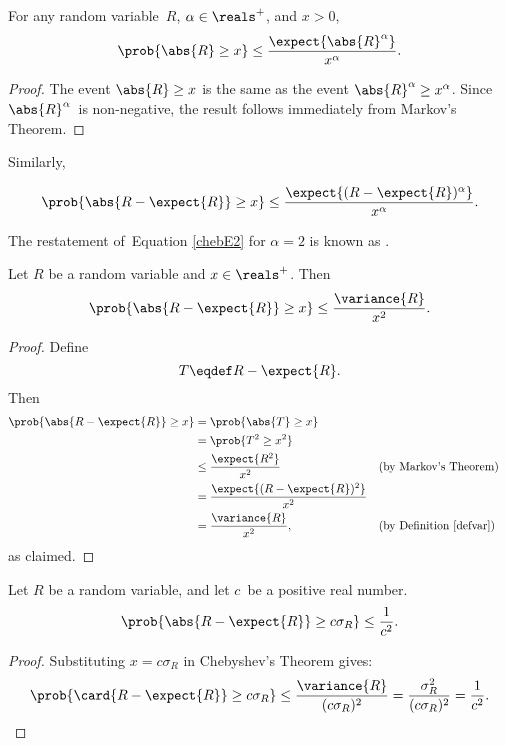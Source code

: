\begin{lemma}\label{lem:Markov2}
For any random variable~$R$, $\alpha \in \reals^+$, and $x > 0$,
\[
\prob{\abs{R} \geq x} \leq \frac{\expect{\abs{R}^\alpha}}{x^\alpha}.
\]
\end{lemma}

\begin{proof}
The event $\abs{R} \ge x$ is the same as the event $\abs{R}^\alpha \ge
x^\alpha$.  Since $\abs{R}^\alpha$~is non-negative, the result follows
immediately from Markov's Theorem.
\end{proof}

Similarly,

\begin{equation}\label{chebE2}
\prob{\abs{R - \expect{R}} \geq x}
    \leq \frac{\expect{(R - \expect{R})^\alpha}}{x^\alpha}.
\end{equation}

The restatement of~Equation \ref{chebE2} for $\alpha=2$ is known as
.
\begin{theorem}[Chebyshev]\label{chebthm}
  Let $R$ be a random variable and $x \in \reals^+$.  Then
\[
\prob{\abs{R - \expect{R}} \geq x} \leq \frac{\variance{R}}{x^2}.
\]
\end{theorem}

\begin{proof}

Define
\begin{equation*}
    T \eqdef R - \expect{R}.
\end{equation*}
Then
\begin{align*}
\prob{ \abs{R - \expect{R}} \ge x }
    &= \prob{\abs{T} \ge x} \\
     &= \prob{T^2 \ge x^2} \\
     &\le \frac{\expect{R^2}}{x^2} && \text{(by Markov's Theorem)} \\
     & = \frac{ \expect{ (R - \expect{R})^2 } }{x^2} \\
     &= \frac{\variance{R}}{x^2},  && \text{(by Definition~\ref{defvar})}
\end{align*}
as claimed.
\end{proof}


\begin{corollary}
\label{cor:cheby}
Let $R$ be a random variable, and let $c$~be a positive real number.
\[
\prob{\abs{R - \expect{R}} \geq c \sigma_R} \leq \frac{1}{c^2}.
\]
\end{corollary}

\begin{proof}
  Substituting $x = c \sigma_R$ in Chebyshev's Theorem gives:
  \begin{equation*}
    \prob{\card{R - \expect{R}} \geq c \sigma_R}
    \leq
    \frac{\variance{R}}{(c \sigma_R)^2}
    =  \frac{\sigma_R^2}{(c \sigma_R)^2}
    = \frac{1}{c^2}.\qedhere
  \end{equation*}
\end{proof}

